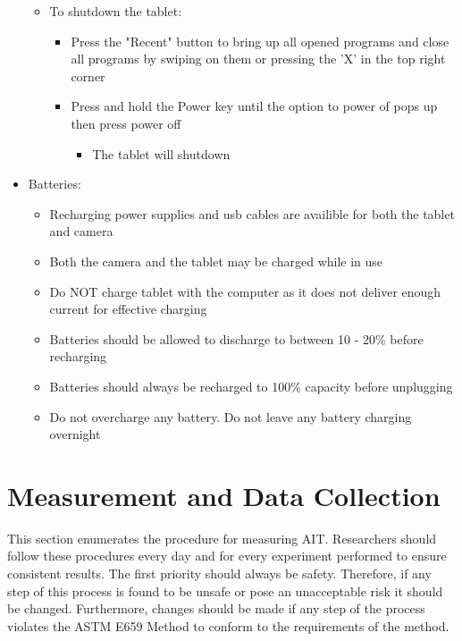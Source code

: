 \documentclass[letterpaper,11pt]{article}
\begin{document}
\begin{itemize}
\begin{itemize}
\begin{itemize}
            \end{itemize}
        
        \item To shutdown the tablet:
            \begin{itemize}
            \item Press the "Recent" button to bring up all opened programs and 
                close all programs by swiping on them or pressing the 'X' in the
                top right corner
            \item Press and hold the Power key until the option to power of 
                pops up then press power off
                \begin{itemize}
                \item The tablet will shutdown
                \end{itemize}
           
            \end{itemize}
        
        \end{itemize}
    
    \item Batteries:
        \begin{itemize}
        \item Recharging power supplies and usb cables are availible for both
            the tablet and camera
        \item Both the camera and the tablet may be charged while in use
        \item Do NOT charge tablet with the computer as it does not deliver 
            enough current for effective charging
        \item Batteries should be allowed to discharge to between 10 - 20\%
            before recharging
        \item Batteries should always be recharged to 100\% capacity before 
            unplugging
        \item Do not overcharge any battery. Do not leave any battery 
            charging overnight
        \end{itemize}
        
    \end{itemize}
    
\newpage
\section{Measurement and Data Collection}
This section enumerates the procedure for measuring AIT. Researchers 
should follow these procedures every day and for every experiment performed to 
ensure consistent results. The first priority should always be safety. 
Therefore, if any step of this process is found to be unsafe or pose an 
unacceptable risk it should be changed. Furthermore, changes should be made if 
any step of the process violates the ASTM E659 Method to conform to the 
requirements of the method.
    
\end{document}

